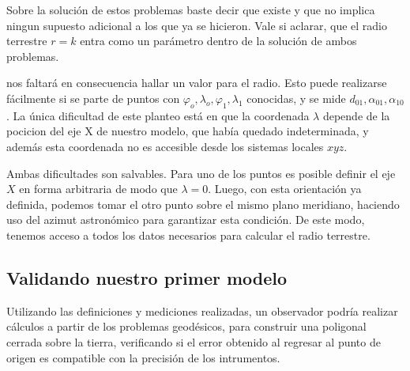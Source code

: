 \documentclass{tufte-book}
\begin{document}
Sobre la solución de estos problemas baste decir que existe y que no implica ningun supuesto adicional
a los que ya se hicieron. Vale si aclarar, que el radio terrestre \(r=k\) entra como un parámetro
dentro de la solución de ambos problemas.

 nos faltará en consecuencia hallar un valor para
el radio. Esto puede realizarse fácilmente si se parte de puntos con \(\varphi_o,\lambda_o,
\varphi_1,\lambda_1\) conocidas, y se mide \(d_{01},\alpha_{01},\alpha_{10}\). La única dificultad
de este planteo está en que la coordenada \(\lambda\) depende de la pocicion del eje X de nuestro modelo,
que había quedado indeterminada, y además esta coordenada no es accesible desde los sistemas locales
\(xyz\).

Ambas dificultades son salvables. Para uno de los puntos es posible definir el eje \(X\) en forma arbitraria
de modo que \(\lambda=0\). Luego, con esta orientación ya definida, podemos tomar el otro punto sobre
el mismo plano meridiano, haciendo uso del azimut astronómico para garantizar esta condición. De este modo,
tenemos acceso a todos los datos necesarios para calcular el radio terrestre.

\subsection{Validando nuestro primer modelo}

Utilizando las definiciones y mediciones realizadas, un observador podría realizar cálculos a partir de
los problemas geodésicos, para construir una poligonal cerrada sobre la tierra, verificando si el error
obtenido al regresar al punto de origen es compatible con la precisión de los intrumentos.
\end{document}
